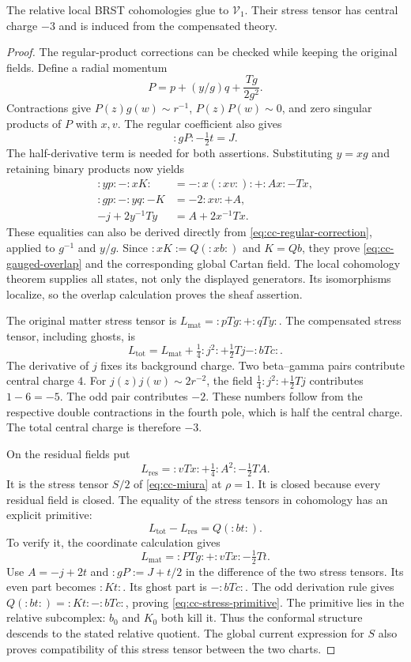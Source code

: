 \begin{proposition}\label{prop:cc-quotient-descent}
The relative local BRST cohomologies glue to $\mathcal V_1$.
Their stress tensor has central charge $-3$ and is induced from the compensated theory.
\end{proposition}
\begin{proof}
The regular-product corrections can be checked while keeping the original fields.
Define a radial momentum
\[
 P=p+(y/g)q+\frac{Tg}{2g^2}.
\]
Contractions give $P(z)g(w)\sim r^{-1}$, $P(z)P(w)\sim0$, and zero singular products of $P$ with $x,v$.
The regular coefficient also gives
\[
 :gP:-\tfrac12t=J.
\]
The half-derivative term is needed for both assertions.
Substituting $y=xg$ and retaining binary products now yields
\begin{align*}
 :yp:-:xK:&=-:x(:xv:):+:Ax:-Tx,\\
 :gp:-:yq:-K&=-2:xv:+A,\\
 -j+2y^{-1}Ty&=A+2x^{-1}Tx.
\end{align*}
These equalities can also be derived directly from
\eqref{eq:cc-regular-correction}, applied to $g^{-1}$ and $y/g$.
Since $:xK:=Q(:xb:)$ and $K=Qb$, they prove \eqref{eq:cc-gauged-overlap} and the corresponding global Cartan field.
The local cohomology theorem supplies all states, not only the displayed generators.
Its isomorphisms localize, so the overlap calculation proves the sheaf assertion.

The original matter stress tensor is
$L_{\mathrm{mat}}=:pTg:+:qTy:$.
The compensated stress tensor, including ghosts, is
\[
 L_{\mathrm{tot}}=L_{\mathrm{mat}}+\tfrac14:j^2:
                     +\tfrac12Tj-:bTc:.
\]
The derivative of $j$ fixes its background charge.
Two beta--gamma pairs contribute central charge $4$.
For $j(z)j(w)\sim2r^{-2}$, the field $\tfrac14:j^2:+\tfrac12Tj$ contributes $1-6=-5$.
The odd pair contributes $-2$.
These numbers follow from the respective double contractions in the fourth pole, which is half the central charge.
The total central charge is therefore $-3$.

On the residual fields put
\[
 L_{\mathrm{res}}=:vTx:+\tfrac14:A^2:-\tfrac12TA.
\]
It is the stress tensor $S/2$ of \eqref{eq:cc-miura} at $\rho=1$.
It is closed because every residual field is closed.
The equality of the stress tensors in cohomology has an explicit primitive:
\begin{equation}\label{eq:cc-stress-primitive}
 L_{\mathrm{tot}}-L_{\mathrm{res}}=Q(:bt:).
\end{equation}
To verify it, the coordinate calculation gives
\[
 L_{\mathrm{mat}}=:PTg:+:vTx:-\tfrac12Tt.
\]
Use $A=-j+2t$ and $:gP:=J+t/2$ in the difference of the two stress tensors.
Its even part becomes $:Kt:$.
Its ghost part is $-:bTc:$.
The odd derivation rule gives
$Q(:bt:)=:Kt:-:bTc:$, proving \eqref{eq:cc-stress-primitive}.
The primitive lies in the relative subcomplex: $b_0$ and $K_0$ both kill it.
Thus the conformal structure descends to the stated relative quotient.
The global current expression for $S$ also proves compatibility of this stress tensor between the two charts.
\end{proof}

